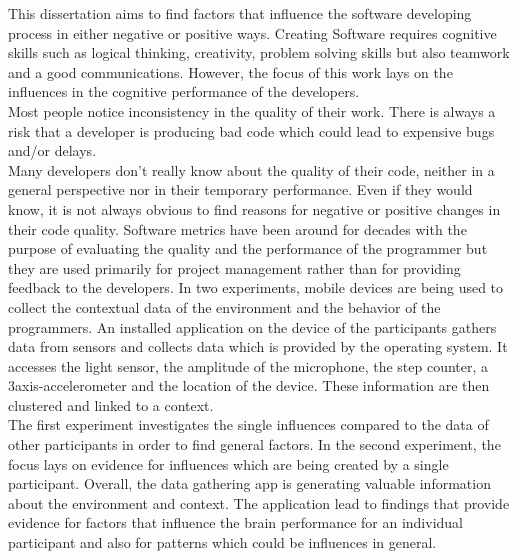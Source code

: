 \documentclass[a4paper, 12pt, oneside]{report}    	%
\begin{document}
\begin{thesisabstract}
%      
This dissertation aims to find factors that influence the software developing process in either negative or positive ways.   
Creating Software requires cognitive skills such as logical thinking, creativity, problem solving skills but also teamwork and a good communications. 
However, the focus of this work lays on the influences in the cognitive performance of the developers.\\ 
Most people notice inconsistency in the quality of their work. There is always a risk that a developer is producing bad code which could lead to expensive bugs and/or delays.\\
Many developers don't really know about the quality of their code, neither in a general perspective nor in their temporary performance. Even if they would know, it is not always obvious to find reasons for negative or positive changes in their code quality.
Software metrics have been around for decades with the purpose of evaluating the quality and the performance of the programmer but they are used primarily for project management rather than for providing feedback to the developers. 
\bigbreak
In two experiments, mobile devices are being used to collect the contextual data of the environment and the behavior of the programmers. 
An installed application on the device of the participants gathers data from sensors and collects data which is provided by the operating system. It accesses the light sensor, the amplitude of the microphone, the step counter, a 3axis-accelerometer and the location of the device. These information are then clustered and linked to a context.\\
The first experiment investigates the single influences compared to the data of other participants in order to find general factors. In the second experiment, the focus lays on evidence for influences which are being created by a single participant. 
\bigbreak
Overall, the data gathering app is generating valuable information about the environment and context. 
The application lead to findings that provide evidence for factors that influence the brain performance for an individual participant and also for patterns which could be influences in general. 
\end{thesisabstract}

\tableofcontents 
\listoftables                                     			%
\listoffigures                                    			%
\end{document}

